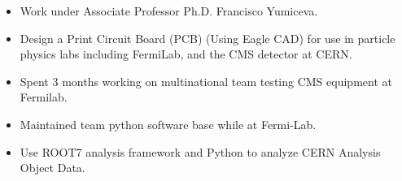 \documentclass[10pt,a4paper,ragged2e,withhyper]{altacv}
\begin{document}
\begin{paracol}{2}
\begin{itemize}
\item Work under Associate Professor Ph.D. Francisco Yumiceva.
\item Design a Print Circuit Board (PCB) (Using Eagle CAD) for use in particle physics labs including FermiLab, and the CMS detector at CERN.
\item Spent 3 months working on multinational team testing CMS equipment at Fermilab.
\item Maintained team python software base while at Fermi-Lab.
\item Use ROOT7 analysis framework and Python to analyze CERN Analysis Object Data.
\end{itemize}

\end{paracol}
\end{document}
